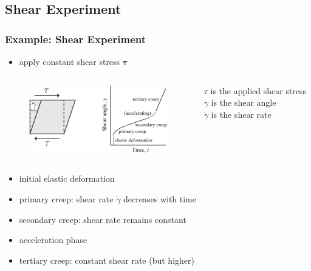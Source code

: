 \documentclass[hide notes,intlimits]{beamer}
\begin{document}
\subsection{Shear Experiment}

\begin{frame}
  \frametitle{Example: Shear Experiment}
  \begin{itemize}
    \item apply constant shear stress $\boldsymbol{\tau}$
\end{itemize}
  \begin{columns}
    \column[c]{8cm}
    \begin{figure}
      \includegraphics[width=6cm]{figures/fig_4_04}
    \end{figure}
    \column[c]{5cm}
    $\tau$ is the applied shear stress\\
    $\gamma$ is the shear angle\\
    $\dot\gamma$ is the shear rate
  \end{columns}
  \begin{itemize}
    \item initial elastic deformation
    \item primary creep: shear rate $\dot\gamma$ decreases with time
    \item \alert{secondary creep}: shear rate remains constant
    \item acceleration phase
    \item tertiary creep: constant shear rate (but higher) 
 \end{itemize}
\end{frame}
\end{document}
